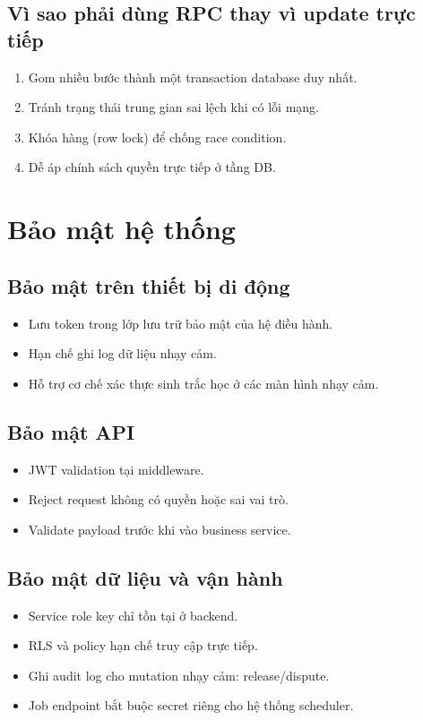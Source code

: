 \documentclass[a4paper,12pt]{report}
\begin{document}
\section{Vì sao phải dùng RPC thay vì update trực tiếp}
\begin{enumerate}
    \item Gom nhiều bước thành một transaction database duy nhất.
    \item Tránh trạng thái trung gian sai lệch khi có lỗi mạng.
    \item Khóa hàng (row lock) để chống race condition.
    \item Dễ áp chính sách quyền trực tiếp ở tầng DB.
\end{enumerate}

\chapter{Bảo mật hệ thống}

\section{Bảo mật trên thiết bị di động}
\begin{itemize}
    \item Lưu token trong lớp lưu trữ bảo mật của hệ điều hành.
    \item Hạn chế ghi log dữ liệu nhạy cảm.
    \item Hỗ trợ cơ chế xác thực sinh trắc học ở các màn hình nhạy cảm.
\end{itemize}

\section{Bảo mật API}
\begin{itemize}
    \item JWT validation tại middleware.
    \item Reject request không có quyền hoặc sai vai trò.
    \item Validate payload trước khi vào business service.
\end{itemize}

\section{Bảo mật dữ liệu và vận hành}
\begin{itemize}
    \item Service role key chỉ tồn tại ở backend.
    \item RLS và policy hạn chế truy cập trực tiếp.
    \item Ghi audit log cho mutation nhạy cảm: release/dispute.
    \item Job endpoint bắt buộc secret riêng cho hệ thống scheduler.
\end{itemize}
\end{document}
